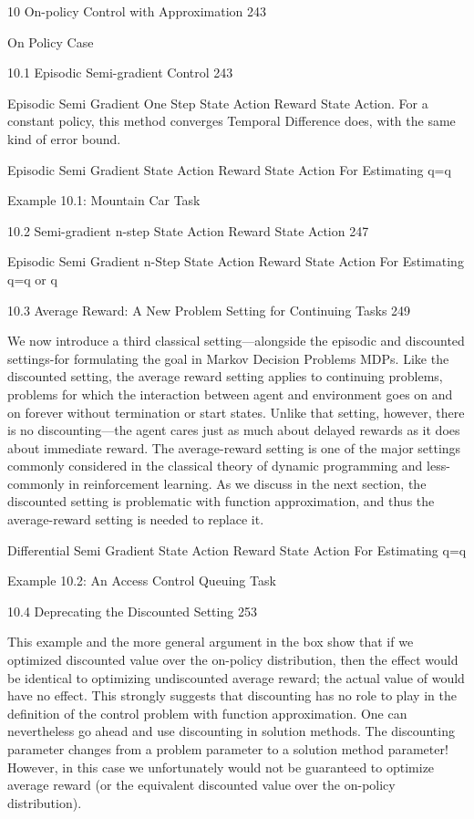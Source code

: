 10 On-policy Control with Approximation 243

On Policy Case

10.1 Episodic Semi-gradient Control 243

Episodic Semi Gradient One Step State Action Reward State Action. For a constant policy, this method converges Temporal Difference does, with the same kind of error bound.

Episodic Semi Gradient State Action Reward State Action For Estimating q=q

Example 10.1: Mountain Car Task

10.2 Semi-gradient n-step State Action Reward State Action 247

Episodic Semi Gradient n-Step State Action Reward State Action For Estimating q=q or q

10.3 Average Reward: A New Problem Setting for Continuing Tasks 249

We now introduce a third classical setting—alongside the episodic and discounted settings-for formulating the goal in Markov Decision Problems MDPs. Like the discounted setting, the average reward setting applies to continuing problems, problems for which the interaction between agent and environment goes on and on forever without termination or start states. Unlike that setting, however, there is no discounting—the agent cares just as much about delayed rewards as it does about immediate reward. The average-reward setting is one of the major settings commonly considered in the classical theory of dynamic programming and less-commonly in reinforcement learning. As we discuss in the next section, the discounted setting is problematic with function approximation, and thus the average-reward setting is needed to replace it.

Differential Semi Gradient State Action Reward State Action For Estimating q=q

Example 10.2: An Access Control Queuing Task

10.4 Deprecating the Discounted Setting 253

This example and the more general argument in the box show that if we optimized discounted value over the on-policy distribution, then the effect would be identical to optimizing undiscounted average reward; the actual value of would have no effect. This strongly suggests that discounting has no role to play in the definition of the control problem with function approximation. One can nevertheless go ahead and use discounting in solution methods. The discounting parameter changes from a problem parameter to a solution method parameter! However, in this case we unfortunately would not be guaranteed to optimize average reward (or the equivalent discounted value over the on-policy distribution).


